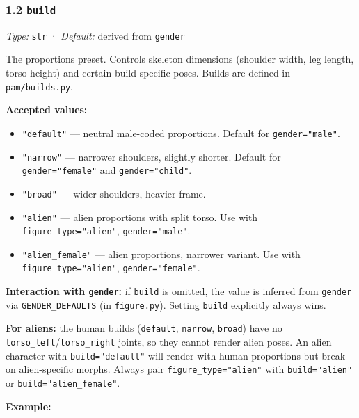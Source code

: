 \documentclass[
  11pt,
]{book}
\providecommand{\tightlist}{%
  \setlength{\itemsep}{0pt}\setlength{\parskip}{0pt}}
\begin{document}
\subsubsection{\texorpdfstring{1.2
\texttt{build}}{1.2 build}}\label{build}

\emph{Type:} \texttt{str} · \emph{Default:} derived from \texttt{gender}

The proportions preset. Controls skeleton dimensions (shoulder width,
leg length, torso height) and certain build-specific poses. Builds are
defined in \texttt{pam/builds.py}.

\textbf{Accepted values:}

\begin{itemize}
\tightlist
\item
  \texttt{"default"} --- neutral male-coded proportions. Default for
  \texttt{gender="male"}.
\item
  \texttt{"narrow"} --- narrower shoulders, slightly shorter. Default
  for \texttt{gender="female"} and \texttt{gender="child"}.
\item
  \texttt{"broad"} --- wider shoulders, heavier frame.
\item
  \texttt{"alien"} --- alien proportions with split torso. Use with
  \texttt{figure\_type="alien"}, \texttt{gender="male"}.
\item
  \texttt{"alien\_female"} --- alien proportions, narrower variant. Use
  with \texttt{figure\_type="alien"}, \texttt{gender="female"}.
\end{itemize}

\textbf{Interaction with \texttt{gender}:} if \texttt{build} is omitted,
the value is inferred from \texttt{gender} via \texttt{GENDER\_DEFAULTS}
(in \texttt{figure.py}). Setting \texttt{build} explicitly always wins.

\textbf{For aliens:} the human builds (\texttt{default},
\texttt{narrow}, \texttt{broad}) have no
\texttt{torso\_left}/\texttt{torso\_right} joints, so they cannot render
alien poses. An alien character with \texttt{build="default"} will
render with human proportions but break on alien-specific morphs. Always
pair \texttt{figure\_type="alien"} with \texttt{build="alien"} or
\texttt{build="alien\_female"}.

\textbf{Example:}
\end{document}
